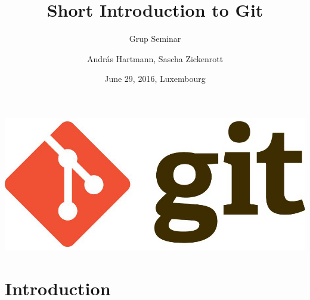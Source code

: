 \documentclass[10pt,xcolor=dvipsnames]{beamer}
\title{Short Introduction to Git}
\subtitle{Grup Seminar}
\author{Andr\'as Hartmann, Sascha Zickenrott}
\institute[LCSB]{
LCSB, Computational Biology group
  University of Luxembourg
}
\date[June 29, 2016]{June 29, 2016, Luxembourg}
\begin{document}
\begin{frame}
  \vspace{2.5em}
\begin{center}
    \includegraphics[height=0.2\textheight]{git-logo.jpg}
\end{center}
  \titlepage
\end{frame}

\section{Introduction}
\end{document}
